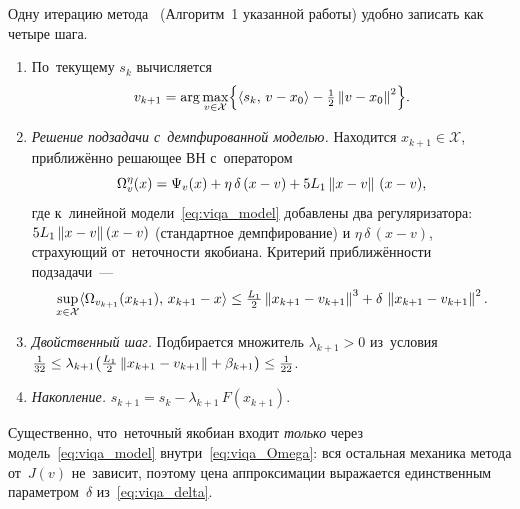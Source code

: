 Одну итерацию метода~\cite{viqa2024} (Алгоритм~1 указанной работы) удобно
записать как четыре шага.
\begin{enumerate}[leftmargin=*]
  \item По~текущему $s_k$ вычисляется
        \[
          v_{k+1}
          = \arg\max_{v\in\mathcal{X}}
            \Bigl\{\langle s_k,\,v-x_0\rangle - \tfrac12\left\|v-x_0\right\|^2\Bigr\}.
        \]
  \item \emph{Решение подзадачи с~демпфированной моделью.} Находится
        $x_{k+1}\in\mathcal{X}$, приближённо решающее ВН с~оператором
        \begin{equation}\label{eq:viqa_Omega}
          \Omega^{\eta}_{v}(x)
          = \Psi_v(x) + \eta\,\delta\,(x-v) + 5L_1\left\|x-v\right\|\,(x-v),
        \end{equation}
        где к~линейной модели~\eqref{eq:viqa_model} добавлены два
        регуляризатора: $5L_1\left\|x-v\right\|(x-v)$
        (стандартное демпфирование) и 
        $\eta\,\delta\,(x-v)$, страхующий от~неточности якобиана. Критерий
        приближённости подзадачи~---
        \begin{equation}\label{eq:viqa_subcrit}
          \sup_{x\in\mathcal{X}}
            \langle\Omega_{v_{k+1}}(x_{k+1}),\,x_{k+1}-x\rangle
          \le \tfrac{L_1}{2}\left\|x_{k+1}-v_{k+1}\right\|^3
              + \delta\,\left\|x_{k+1}-v_{k+1}\right\|^2 .
        \end{equation}
  \item \emph{Двойственный шаг.} Подбирается множитель $\lambda_{k+1}>0$
        из~условия
        $\tfrac{1}{32}\le\lambda_{k+1}\bigl(\tfrac{L_1}{2}\left\|x_{k+1}-v_{k+1}\right\|
        +\beta_{k+1}\bigr)\le\tfrac{1}{22}$.
  \item \emph{Накопление.} $s_{k+1} = s_k - \lambda_{k+1}\,F(x_{k+1})$.
\end{enumerate}
Существенно, что~неточный якобиан входит \emph{только} через
модель~\eqref{eq:viqa_model} внутри~\eqref{eq:viqa_Omega}: вся остальная
механика метода от~$J(v)$ не~зависит, поэтому цена аппроксимации
выражается единственным параметром~$\delta$
из~\eqref{eq:viqa_delta}.

